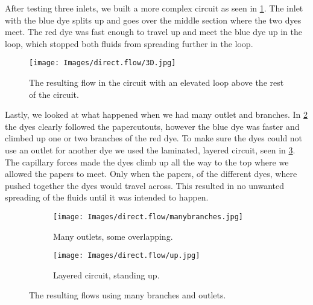 After testing three inlets, we built a more complex circuit as seen in \ref{fig:3D}. The inlet with the blue dye splits up and goes over the middle section where the two dyes meet. The red dye was fast enough to travel up and meet the blue dye up in the loop, which stopped both fluids from spreading further in the loop. 
\begin{figure}[H]
    \centering
    \texttt{[image: Images/direct.flow/3D.jpg]}
    \caption{The resulting flow in the circuit with an elevated loop above the rest of the circuit.}
    \label{fig:3D}
\end{figure}

Lastly, we looked at what happened when we had many outlet and branches. In \ref{fig:sub:branches} the dyes clearly followed the papercutouts, however the blue dye was faster and climbed up one or two branches of the red dye. To make sure the dyes could not use an outlet for another dye we used the laminated, layered circuit, seen in \ref{fig:sub:u}. The capillary forces made the dyes climb up all the way to the top where we allowed the papers to meet. Only when the papers, of the different dyes, where pushed together the dyes would travel across. This resulted in no unwanted spreading of the fluids until it was intended to happen.
\begin{figure}[H]
\centering
\begin{subfigure}[b]{\subSizeO\textwidth}
  \centering
  \texttt{[image: Images/direct.flow/manybranches.jpg]}
  \caption{Many outlets, some overlapping.}
  \label{fig:sub:branches}
\end{subfigure}%
\begin{subfigure}[b]{\subSizeO \textwidth}
  \centering
  \texttt{[image: Images/direct.flow/up.jpg]}
  \caption{Layered circuit, standing up.}
  \label{fig:sub:u}
\end{subfigure}
\caption{The resulting flows using many branches and outlets.}
\label{fig:manyup}
\end{figure}